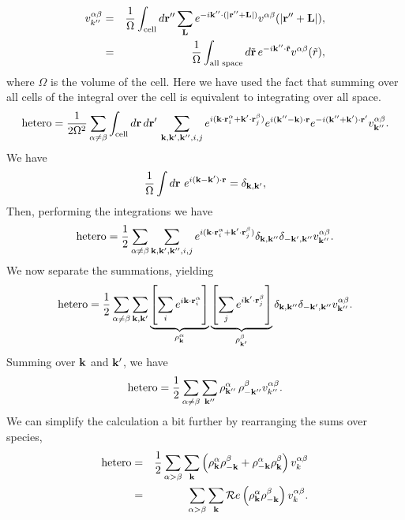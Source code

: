 \documentclass{article}
\begin{document}
\begin{eqnarray}
v_{k''}^{\alpha \beta} & = & 
\frac{1}{\Omega} \int_{\text{cell}} d\mathbf{r}'' \sum_{\mathbf{L}}
e^{-i\mathbf{k}''\cdot(|\mathbf{r}''+\mathbf{L}|)} v^{\alpha\beta}(|\mathbf{r}''+\mathbf{L}|), \\
& = & \frac{1}{\Omega} \int_\text{all space} d\tilde{\mathbf{r}} \, 
    e^{-i\mathbf{k}'' \cdot \tilde{\mathbf{r}}} v^{\alpha\beta}(\tilde{r}), \label{eq:vk}
\end{eqnarray}
where $\Omega$ is the volume of the cell. Here we have used the fact
that summing over all cells of the integral over the cell is
equivalent to integrating over all space.
\begin{equation}
\text{hetero} = \frac{1}{2\Omega^2} \sum_{\alpha \neq \beta}
\int_\text{cell} d\mathbf{r} \, d\mathbf{r}' \, \sum_{\mathbf{k}, \mathbf{k}', \mathbf{k}'', i, j}
e^{i(\mathbf{k} \cdot \mathbf{r}_i^\alpha + \mathbf{k}' \cdot\mathbf{r}_j^\beta)} e^{i(\mathbf{k}''-\mathbf{k})\cdot \mathbf{r}}
e^{-i(\mathbf{k}'' + \mathbf{k}')\cdot \mathbf{r}'} v^{\alpha \beta}_{\mathbf{k}''}.
\end{equation}
We have
\begin{equation}
\frac{1}{\Omega} \int d\mathbf{r} \  e^{i(\mathbf{k} -\mathbf{k}')\cdot \mathbf{r}} =
\delta_{\mathbf{k},\mathbf{k}'},
\end{equation}
Then, performing the integrations we have
\begin{eqnarray}
\text{hetero} = \frac{1}{2} \sum_{\alpha \neq \beta}
\sum_{\mathbf{k}, \mathbf{k}', \mathbf{k}'', i, j}
e^{i(\mathbf{k} \cdot \mathbf{r}_i^\alpha + \mathbf{k}' \cdot\mathbf{r}_j^\beta)} \delta_{\mathbf{k},\mathbf{k}''}
\delta_{-\mathbf{k}', \mathbf{k}''} v^{\alpha \beta}_{\mathbf{k}''}.
\end{eqnarray}
We now separate the summations, yielding
\begin{equation}
\text{hetero} = \frac{1}{2} \sum_{\alpha \neq \beta} \sum_{\vk, \vk'}
\underbrace{\left[\sum_i e^{i\vk  \cdot \vr_i^\alpha} \rule{0cm}{0.705cm}
    \right]}_{\rho_\vk^\alpha}
\underbrace{\left[\sum_j e^{i\vk' \cdot \vr_j^\beta} \right]}_{\rho_{\vk'}^\beta}
 \delta_{\vk,\vk''} \delta_{-\vk', \vk''} v^{\alpha
  \beta}_{\vk''}.
\end{equation}
Summing over $\mathbf{k}$ and $\mathbf{k}'$, we have
\begin{equation}
\text{hetero} = \frac{1}{2} \sum_{\alpha \neq \beta} \sum_{\mathbf{k}''}
\rho_{\mathbf{k}''}^\alpha \, \rho_{-\mathbf{k}''}^\beta v_{k''}^{\alpha \beta}.
\end{equation}
We can simplify the calculation a bit further by rearranging the
sums over species,
\begin{eqnarray}
\text{hetero} & = & \frac{1}{2} \sum_{\alpha > \beta} \sum_{\mathbf{k}}
\left(\rho^\alpha_{\mathbf{k}} \rho^\beta_{-\mathbf{k}} + \rho^\alpha_{-\mathbf{k}}
\rho^\beta_{\mathbf{k}}\right) v_{k}^{\alpha\beta} \\
& = & \sum_{\alpha > \beta} \sum_{\mathbf{k}} \mathcal{R}e\left(\rho_{\mathbf{k}}^\alpha
\rho_{-\mathbf{k}}^\beta\right)v_k^{\alpha\beta} .
\end{eqnarray}
\end{document}
